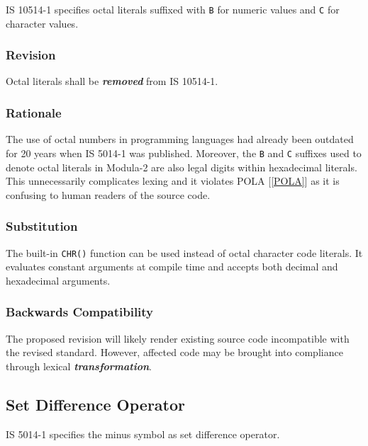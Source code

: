 \documentclass[10pt,a4paper,leqno,fleqn]{article}
\renewcommand{\emph}[1]{\textbf{\textit{#1}}}
\begin{document}
IS 10514-1 specifies octal literals suffixed with \verb|B| for numeric values
and \verb|C| for character values.

\subsubsection{Revision}
Octal literals shall be \emph{removed} from IS 10514-1.

\subsubsection{Rationale}

The use of octal numbers in programming languages had already been
outdated for 20 years when IS 5014-1 was published. Moreover, the \verb|B|
and \verb|C| suffixes used to denote octal literals in Modula-2 are also legal
digits within hexadecimal literals. This unnecessarily complicates lexing and
it violates POLA [\ref{POLA}] as it is confusing to human readers of the
source code. 

\subsubsection{Substitution}

The built-in \verb|CHR()| function can be used instead of octal character code
literals. It evaluates constant arguments at compile time and accepts both
decimal and hexadecimal arguments.

\subsubsection{Backwards Compatibility}

The proposed revision will likely render existing source code incompatible with
the revised standard. However, affected code may be brought into compliance
through lexical \emph{transformation}.

\subsection{Set Difference Operator}
\abovedisplayshortskip=0pt

IS 5014-1 specifies the minus symbol as set difference operator.
\end{document}
